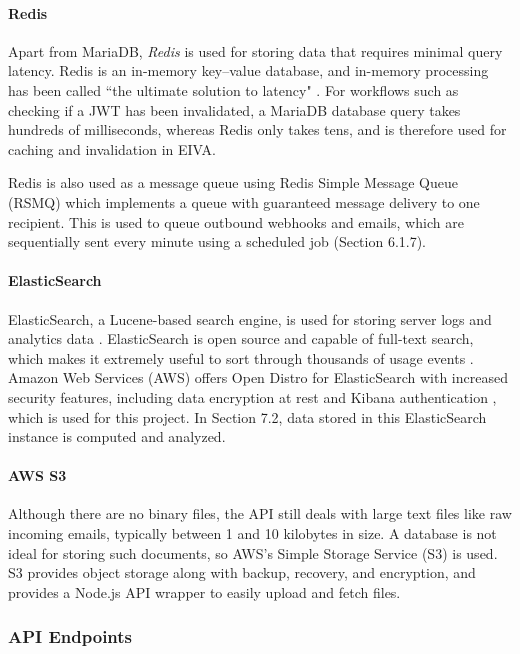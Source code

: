 \documentclass{article}
\begin{document}
\paragraph{Redis}

Apart from MariaDB, \emph{Redis} is used for storing data that requires minimal query latency. Redis is an in-memory key–value database, and in-memory processing has been called ``the ultimate solution to latency" \cite{alami_supply_2018}. For workflows such as checking if a JWT has been invalidated, a MariaDB database query takes hundreds of milliseconds, whereas Redis only takes tens, and is therefore used for caching and invalidation in EIVA.

Redis is also used as a message queue using Redis Simple Message Queue (RSMQ) which implements a queue with guaranteed message delivery to one recipient. This is used to queue outbound webhooks and emails, which are sequentially sent every minute using a scheduled job (Section 6.1.7).

\paragraph{ElasticSearch}

ElasticSearch, a Lucene-based search engine, is used for storing server logs and analytics data \cite{noauthor_elastic_nodate}. ElasticSearch is open source and capable of full-text search, which makes it extremely useful to sort through thousands of usage events \cite{noauthor_elastic/elasticsearch_2020}. Amazon Web Services (AWS) offers Open Distro for ElasticSearch with increased security features, including data encryption at rest and Kibana authentication \cite{noauthor_open_nodate}, which is used for this project. In Section 7.2, data stored in this ElasticSearch instance is computed and analyzed.

\paragraph{AWS S3}

Although there are no binary files, the API still deals with large text files like raw incoming emails, typically between 1 and 10 kilobytes in size. A database is not ideal for storing such documents, so AWS's Simple Storage Service (S3) is used. S3 provides object storage along with backup, recovery, and encryption, and provides a Node.js API wrapper to easily upload and fetch files.

\subsubsection{API Endpoints}
\end{document}

